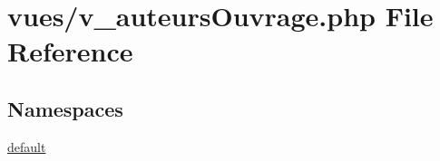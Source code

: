 \hypertarget{v__auteurs_ouvrage_8php}{}\section{vues/v\+\_\+auteurs\+Ouvrage.php File Reference}
\label{v__auteurs_ouvrage_8php}
\subsection*{Namespaces}
\begin{DoxyCompactItemize}
\item 
 \hyperlink{namespacedefault}{default}
\end{DoxyCompactItemize}
